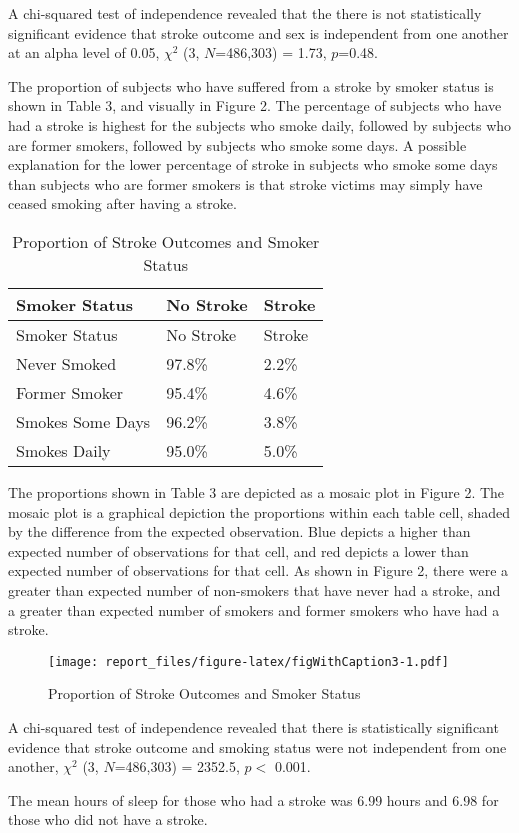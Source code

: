 \documentclass[11pt,]{article}
\begin{document}
A chi-squared test of independence revealed that the there is not
statistically significant evidence that stroke outcome and sex is
independent from one another at an alpha level of 0.05, \(\chi^2\) (3,
\(N\)=486,303) = 1.73, \(p\)=0.48.

The proportion of subjects who have suffered from a stroke by smoker
status is shown in Table 3, and visually in Figure 2. The percentage of
subjects who have had a stroke is highest for the subjects who smoke
daily, followed by subjects who are former smokers, followed by subjects
who smoke some days. A possible explanation for the lower percentage of
stroke in subjects who smoke some days than subjects who are former
smokers is that stroke victims may simply have ceased smoking after
having a stroke.

\begin{longtable}[]{@{}lll@{}}
\caption{Proportion of Stroke Outcomes and Smoker Status}\tabularnewline
\toprule
Smoker Status & No Stroke & Stroke\tabularnewline
\midrule
\endfirsthead
\toprule
Smoker Status & No Stroke & Stroke\tabularnewline
\midrule
\endhead
Never Smoked & 97.8\% & 2.2\%\tabularnewline
Former Smoker & 95.4\% & 4.6\%\tabularnewline
Smokes Some Days & 96.2\% & 3.8\%\tabularnewline
Smokes Daily & 95.0\% & 5.0\%\tabularnewline
\bottomrule
\end{longtable}

The proportions shown in Table 3 are depicted as a mosaic plot in Figure
2. The mosaic plot is a graphical depiction the proportions within each
table cell, shaded by the difference from the expected observation. Blue
depicts a higher than expected number of observations for that cell, and
red depicts a lower than expected number of observations for that cell.
As shown in Figure 2, there were a greater than expected number of
non-smokers that have never had a stroke, and a greater than expected
number of smokers and former smokers who have had a stroke.

\begin{figure}
\centering
\texttt{[image: report\_files/figure-latex/figWithCaption3-1.pdf]}
\caption{Proportion of Stroke Outcomes and Smoker Status}
\end{figure}

A chi-squared test of independence revealed that there is statistically
significant evidence that stroke outcome and smoking status were not
independent from one another, \(\chi^2\) (3, \(N\)=486,303) = 2352.5,
\(p <\) 0.001.

The mean hours of sleep for those who had a stroke was 6.99 hours and
6.98 for those who did not have a stroke.
\end{document}
